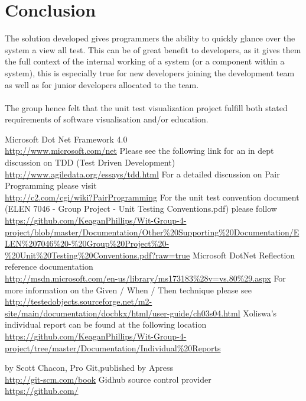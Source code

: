 \documentclass[a4paper,12pt]{article}
\begin{document}
\section{Conclusion}
The solution developed gives programmers the ability to quickly glance over the system a view all test. This can be of great benefit to developers, as it gives them the full context of the internal working of a system (or a component within a system), this is especially true for new developers joining the development team as well as for junior developers allocated to the team.\\
\\
The group hence felt that the unit test visualization project fulfill both stated requirements of software visualisation and/or education.


\begin{thebibliography}{5}
 Microsoft Dot Net Framework 4.0\\ \url{http://www.microsoft.com/net}
 Please see the following link for an in dept discussion on TDD (Test Driven Development)\\ \url{http://www.agiledata.org/essays/tdd.html}
 For a detailed discussion on Pair Programming please visit\\ \url{http://c2.com/cgi/wiki?PairProgramming}
 For the unit test convention document (ELEN 7046 - Group Project - Unit Testing Conventions.pdf) please follow\\ \url{https://github.com/KeaganPhillips/Wit-Group-4-project/blob/master/Documentation/Other%20Supporting%20Documentation/ELEN%207046%20-%20Group%20Project%20-%20Unit%20Testing%20Conventions.pdf?raw=true}
 Microsoft DotNet Reflection reference documentation\\ \url{http://msdn.microsoft.com/en-us/library/ms173183%28v=vs.80%29.aspx}
 For more information on the Given / When / Then technique please see\\ \url{http://testedobjects.sourceforge.net/m2-site/main/documentation/docbkx/html/user-guide/ch03s04.html}
 Xoliswa's individual report can be found at the following location\\ \url{https://github.com/KeaganPhillips/Wit-Group-4-project/tree/master/Documentation/Individual%20Reports}

 by Scott Chacon, Pro Git,published by Apress\\ \url{http://git-scm.com/book}
 Gidhub source control provider\\ \url{https://github.com/}


\end{thebibliography}

 
\end{document}
